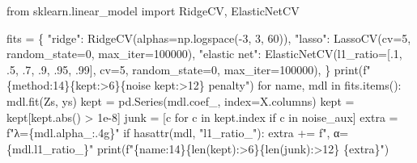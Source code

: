 \documentclass[
  letterpaper,
  10pt,
  twoside,
  openright,
  numbers=noenddot,
  chapterprefix=true]{scrbook}
\newenvironment{Shaded}{}{}
\newcommand{\BuiltInTok}[1]{\textcolor[rgb]{0.84,0.23,0.29}{#1}}
\newcommand{\ControlFlowTok}[1]{\textcolor[rgb]{0.84,0.23,0.29}{#1}}
\newcommand{\DecValTok}[1]{\textcolor[rgb]{0.00,0.36,0.77}{#1}}
\newcommand{\FloatTok}[1]{\textcolor[rgb]{0.00,0.36,0.77}{#1}}
\newcommand{\ImportTok}[1]{\textcolor[rgb]{0.01,0.18,0.38}{#1}}
\newcommand{\KeywordTok}[1]{\textcolor[rgb]{0.84,0.23,0.29}{#1}}
\newcommand{\NormalTok}[1]{\textcolor[rgb]{0.14,0.16,0.18}{#1}}
\newcommand{\OperatorTok}[1]{\textcolor[rgb]{0.14,0.16,0.18}{#1}}
\newcommand{\SpecialCharTok}[1]{\textcolor[rgb]{0.00,0.36,0.77}{#1}}
\newcommand{\SpecialStringTok}[1]{\textcolor[rgb]{0.01,0.18,0.38}{#1}}
\newcommand{\StringTok}[1]{\textcolor[rgb]{0.01,0.18,0.38}{#1}}
\begin{document}
\label{check-compare}
\begin{Shaded}
\begin{Highlighting}[]
\ImportTok{from}\NormalTok{ sklearn.linear\_model }\ImportTok{import}\NormalTok{ RidgeCV, ElasticNetCV}

\NormalTok{fits }\OperatorTok{=}\NormalTok{ \{}
    \StringTok{"ridge"}\NormalTok{:       RidgeCV(alphas}\OperatorTok{=}\NormalTok{np.logspace(}\OperatorTok{{-}}\DecValTok{3}\NormalTok{, }\DecValTok{3}\NormalTok{, }\DecValTok{60}\NormalTok{)),}
    \StringTok{"lasso"}\NormalTok{:       LassoCV(cv}\OperatorTok{=}\DecValTok{5}\NormalTok{, random\_state}\OperatorTok{=}\DecValTok{0}\NormalTok{, max\_iter}\OperatorTok{=}\DecValTok{100000}\NormalTok{),}
    \StringTok{"elastic net"}\NormalTok{: ElasticNetCV(l1\_ratio}\OperatorTok{=}\NormalTok{[}\FloatTok{.1}\NormalTok{, }\FloatTok{.5}\NormalTok{, }\FloatTok{.7}\NormalTok{, }\FloatTok{.9}\NormalTok{, }\FloatTok{.95}\NormalTok{, }\FloatTok{.99}\NormalTok{],}
\NormalTok{                                cv}\OperatorTok{=}\DecValTok{5}\NormalTok{, random\_state}\OperatorTok{=}\DecValTok{0}\NormalTok{, max\_iter}\OperatorTok{=}\DecValTok{100000}\NormalTok{),}
\NormalTok{\}}
\BuiltInTok{print}\NormalTok{(}\SpecialStringTok{f"}\SpecialCharTok{\{}\StringTok{\textquotesingle{}method\textquotesingle{}}\SpecialCharTok{:14\}\{}\StringTok{\textquotesingle{}kept\textquotesingle{}}\SpecialCharTok{:\textgreater{}6\}\{}\StringTok{\textquotesingle{}noise kept\textquotesingle{}}\SpecialCharTok{:\textgreater{}12\}}\SpecialStringTok{   penalty"}\NormalTok{)}
\ControlFlowTok{for}\NormalTok{ name, mdl }\KeywordTok{in}\NormalTok{ fits.items():}
\NormalTok{    mdl.fit(Zs, ys)}
\NormalTok{    kept }\OperatorTok{=}\NormalTok{ pd.Series(mdl.coef\_, index}\OperatorTok{=}\NormalTok{X.columns)}
\NormalTok{    kept }\OperatorTok{=}\NormalTok{ kept[kept.}\BuiltInTok{abs}\NormalTok{() }\OperatorTok{\textgreater{}} \FloatTok{1e{-}8}\NormalTok{]}
\NormalTok{    junk }\OperatorTok{=}\NormalTok{ [c }\ControlFlowTok{for}\NormalTok{ c }\KeywordTok{in}\NormalTok{ kept.index }\ControlFlowTok{if}\NormalTok{ c }\KeywordTok{in}\NormalTok{ noise\_aux]}
\NormalTok{    extra }\OperatorTok{=} \SpecialStringTok{f"λ=}\SpecialCharTok{\{}\NormalTok{mdl}\SpecialCharTok{.}\NormalTok{alpha\_}\SpecialCharTok{:.4g\}}\SpecialStringTok{"}
    \ControlFlowTok{if} \BuiltInTok{hasattr}\NormalTok{(mdl, }\StringTok{"l1\_ratio\_"}\NormalTok{):}
\NormalTok{        extra }\OperatorTok{+=} \SpecialStringTok{f", α=}\SpecialCharTok{\{}\NormalTok{mdl}\SpecialCharTok{.}\NormalTok{l1\_ratio\_}\SpecialCharTok{\}}\SpecialStringTok{"}
    \BuiltInTok{print}\NormalTok{(}\SpecialStringTok{f"}\SpecialCharTok{\{}\NormalTok{name}\SpecialCharTok{:14\}\{}\BuiltInTok{len}\NormalTok{(kept)}\SpecialCharTok{:\textgreater{}6\}\{}\BuiltInTok{len}\NormalTok{(junk)}\SpecialCharTok{:\textgreater{}12\}}\SpecialStringTok{   }\SpecialCharTok{\{}\NormalTok{extra}\SpecialCharTok{\}}\SpecialStringTok{"}\NormalTok{)}


\end{Highlighting}
\end{Shaded}
\end{document}
